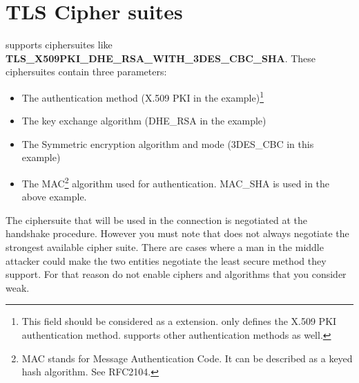 \newpage
\section{TLS Cipher suites}
\par 
\tlsI supports ciphersuites like {\bf TLS\_X509PKI\_DHE\_RSA\_WITH\_3DES\_CBC\_SHA}.
These ciphersuites contain three parameters:
\begin{itemize}
\item The authentication method (X.509 PKI in the example)\footnote{
This field should be considered as a \gnutls extension. \tlsI only defines
the X.509 PKI authentication method. \gnutls supports other authentication
methods as well.}
\item The key exchange algorithm (DHE\_RSA in the example)
\item The Symmetric encryption algorithm and mode (3DES\_CBC in this
example)
\item The MAC\footnote{MAC stands for Message Authentication Code. It can
be described as a keyed hash algorithm. See RFC2104.} algorithm used for authentication.
MAC\_SHA is used in the above example.
\end{itemize}

The ciphersuite that will be used in the connection is negotiated at
the handshake procedure. However you must note that \tlsI does not always
negotiate the strongest available cipher suite. There are cases where
a man in the middle attacker could make the two entities negotiate
the least secure method they support. For that reason do not enable
ciphers and algorithms that you consider weak.

\addvspace{1.5cm}

